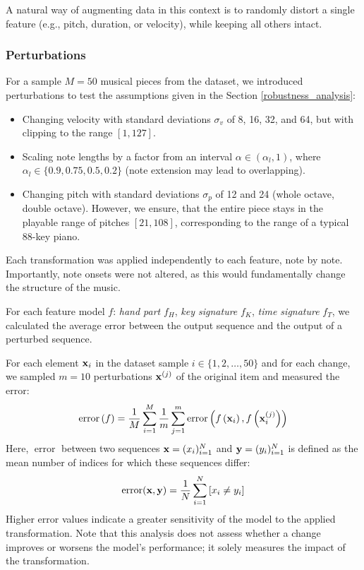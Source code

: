 A natural way of augmenting data in this context is to randomly distort a single feature (e.g., pitch, duration, or velocity), while keeping all others intact.

\subsubsection{Perturbations} \label{perturbations}

For a sample $M = 50$ musical pieces from the dataset, we introduced perturbations to test the assumptions given in the Section \ref{robustness_analysis}: \begin{itemize}
	\item Changing velocity with standard deviations $\sigma_v$ of 8, 16, 32, and 64, but with clipping to the range $[1, 127]$.
	\item Scaling note lengths by a factor from an interval $\alpha\in(\alpha_l,1)$, where $\alpha_l\in\{0.9, 0.75, 0.5, 0.2\}$ (note extension may lead to overlapping).
	\item Changing pitch with standard deviations $\sigma_p$ of 12 and 24 (whole octave, double octave). However, we ensure, that the entire piece stays in the playable range of pitches $[21, 108]$, corresponding to the range of a typical $88$-key piano.
\end{itemize}

Each transformation was applied independently to each feature, note by note. Importantly, note onsets were not altered, as this would fundamentally change the structure of the music.

For each feature model $f$: \emph{hand part} $f_H$, \emph{key signature} $f_K$, \emph{time signature} $f_T$, we calculated the average error between the output sequence and the output of a perturbed sequence.

For each element ${\bf x}_i$ in the dataset sample $i\in\{1,2,\ldots,50\}$ and for each change, we sampled $m=10$ perturbations ${\bf x}^{(j)}$ of the original item and measured the error: \[\operatorname{error}\left(f\right) = \frac{1}{M}\sum_{i=1}^{M}\frac{1}{m}\sum_{j=1}^{m}\operatorname{error}\left(f\left({\bf x}_i\right), f\left({\bf x}_i^{(j)}\right)\right)\] Here, $\operatorname{error}$ between two sequences ${\bf x} = (x_i)_{i=1}^N$ and ${\bf y} = (y_i)_{i=1}^N$ is defined as the mean number of indices for which these sequences differ: \[\operatorname{error}({\bf x},{\bf y}) = \frac{1}{N}\sum_{i=1}^N \left[x_i \neq y_i\right]\]  Higher error values indicate a greater sensitivity of the model to the applied transformation. Note that this analysis does not assess whether a change improves or worsens the model’s performance; it solely measures the impact of the transformation.

